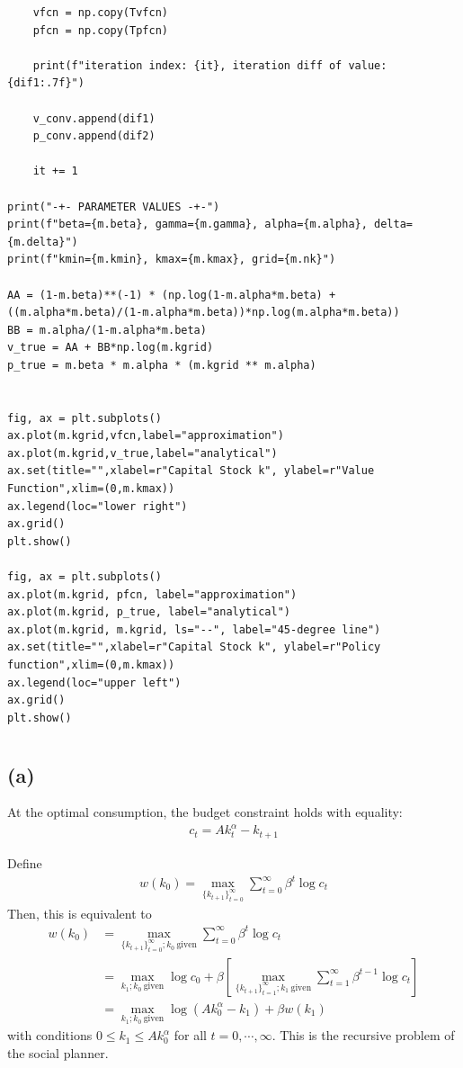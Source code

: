 \documentclass{ltjsarticle}
\begin{document}
\begin{lstlisting}
    vfcn = np.copy(Tvfcn)
    pfcn = np.copy(Tpfcn)

    print(f"iteration index: {it}, iteration diff of value: {dif1:.7f}")

    v_conv.append(dif1)
    p_conv.append(dif2)

    it += 1

print("-+- PARAMETER VALUES -+-")
print(f"beta={m.beta}, gamma={m.gamma}, alpha={m.alpha}, delta={m.delta}")
print(f"kmin={m.kmin}, kmax={m.kmax}, grid={m.nk}")

AA = (1-m.beta)**(-1) * (np.log(1-m.alpha*m.beta) + ((m.alpha*m.beta)/(1-m.alpha*m.beta))*np.log(m.alpha*m.beta))
BB = m.alpha/(1-m.alpha*m.beta)
v_true = AA + BB*np.log(m.kgrid)
p_true = m.beta * m.alpha * (m.kgrid ** m.alpha)


fig, ax = plt.subplots()
ax.plot(m.kgrid,vfcn,label="approximation")
ax.plot(m.kgrid,v_true,label="analytical")
ax.set(title="",xlabel=r"Capital Stock k", ylabel=r"Value Function",xlim=(0,m.kmax))
ax.legend(loc="lower right")
ax.grid()
plt.show()

fig, ax = plt.subplots()
ax.plot(m.kgrid, pfcn, label="approximation")
ax.plot(m.kgrid, p_true, label="analytical")
ax.plot(m.kgrid, m.kgrid, ls="--", label="45-degree line")
ax.set(title="",xlabel=r"Capital Stock k", ylabel=r"Policy function",xlim=(0,m.kmax))
ax.legend(loc="upper left")
ax.grid()
plt.show()
\end{lstlisting}


\section{} %

\subsection*{(a)}

At the optimal consumption, the budget constraint holds with equality:
\begin{gather*}
    c_t = A k_t^\alpha - k_{t+1}
\end{gather*}

Define 
\begin{gather*}
    w(k_0) = \max_{\{k_{t+1}\}_{t=0}^\infty} \sum_{t=0}^\infty \beta^t \log c_t
\end{gather*}
Then, this is equivalent to
\begin{align*}
    w(k_0) 
    &= \max_{\{k_{t+1}\}_{t=0}^\infty ; k_0 \: \text{given}} \sum_{t=0}^\infty \beta^t \log c_t \\
    &= \max_{k_1; k_0 \: \text{given}} \log c_0 + \beta \left[\max_{\{k_{t+1}\}_{t=1}^\infty ; k_1 \: \text{given}} \sum_{t=1}^\infty \beta^{t-1} \log c_t \right] \\
    &= \max_{k_1; k_0 \: \text{given}} \log (A k_0^\alpha - k_1) + \beta w(k_1)
\end{align*}
with conditions $0 \leq k_1 \leq A k_0^\alpha$ for all $t = 0, \cdots, \infty$. This is the recursive problem of the social planner.
\end{document}
